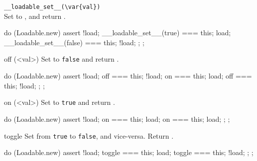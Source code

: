\begin{urbiscriptapi}
\item \lstinline|__loadable_set__(\var{val})|\\
  Set  to , and return \this.
\begin{urbiassert}
do (Loadable.new)
{
  assert
  {
    !load;
    __loadable_set__(true) === this;
    load;
    __loadable_set__(false) === this;
    !load;
  };
};
\end{urbiassert}

\item[off](<val>)%
  Set  to \lstinline|false| and return \this.
\begin{urbiassert}
do (Loadable.new)
{
  assert
  {
    !load;
    off === this;
    !load;
    on === this;
    load;
    off === this;
    !load;
  };
};
\end{urbiassert}

\item[on](<val>)%
  Set  to \lstinline|true| and return \this.
\begin{urbiassert}
do (Loadable.new)
{
  assert
  {
    !load;
    on === this;
    load;
    on === this;
    load;
  };
};
\end{urbiassert}

\item[toggle]%
  Set  from \lstinline|true| to \lstinline|false|, and
  vice-versa.  Return .
\begin{urbiassert}
do (Loadable.new)
{
  assert
  {
    !load;
    toggle === this;
    load;
    toggle === this;
    !load;
  };
};
\end{urbiassert}
\end{urbiscriptapi}

